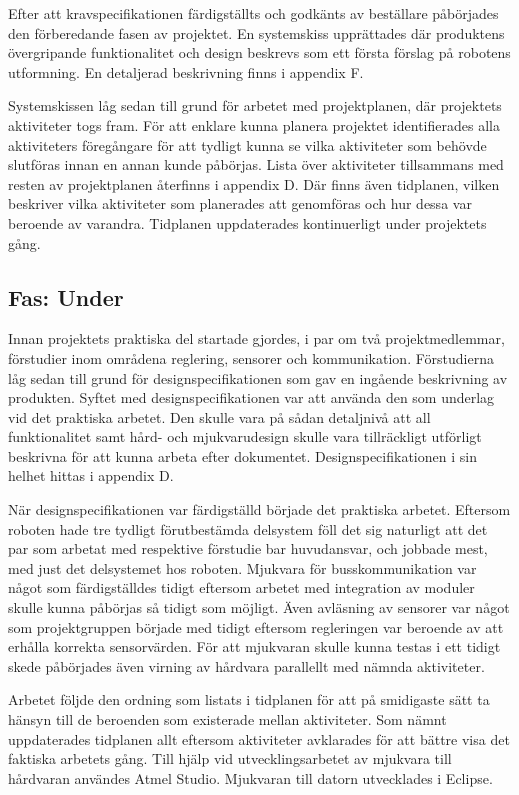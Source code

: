 \documentclass[11pt]{article}
\begin{document}
\begin{flushleft}
Efter att kravspecifikationen färdigställts och godkänts av beställare påbörjades den förberedande fasen av projektet. En systemskiss upprättades där produktens övergripande funktionalitet och design beskrevs som ett första förslag på robotens utformning. En detaljerad beskrivning finns i appendix F. 

Systemskissen låg sedan till grund för arbetet med projektplanen, där projektets aktiviteter togs fram. För att enklare kunna planera projektet identifierades alla aktiviteters föregångare för att tydligt kunna se vilka aktiviteter som behövde slutföras innan en annan kunde påbörjas. Lista över aktiviteter tillsammans med resten av projektplanen återfinns i appendix D. Där finns även tidplanen, vilken beskriver vilka aktiviteter som planerades att genomföras och hur dessa var beroende av varandra. Tidplanen uppdaterades kontinuerligt under projektets gång.

\subsection{Fas: Under}
Innan projektets praktiska del startade gjordes, i par om två projektmedlemmar, förstudier inom områdena reglering, sensorer och kommunikation. Förstudierna låg sedan till grund för designspecifikationen som gav en ingående beskrivning av produkten. Syftet med designspecifikationen var att använda den som underlag vid det praktiska arbetet. Den skulle vara på sådan detaljnivå att all funktionalitet samt hård- och mjukvarudesign skulle vara tillräckligt utförligt beskrivna för att kunna arbeta efter dokumentet. Designspecifikationen i sin helhet hittas i appendix D. 

När designspecifikationen var färdigställd började det praktiska arbetet. Eftersom roboten hade tre tydligt förutbestämda delsystem föll det sig naturligt att det par som arbetat med respektive förstudie bar huvudansvar, och jobbade mest, med just det delsystemet hos roboten. Mjukvara för busskommunikation var något som färdigställdes tidigt eftersom arbetet med integration av moduler skulle kunna påbörjas så tidigt som möjligt. Även avläsning av sensorer var något som projektgruppen började med tidigt eftersom regleringen var beroende av att erhålla korrekta sensorvärden. För att mjukvaran skulle kunna testas i ett tidigt skede påbörjades även virning av hårdvara parallellt med nämnda aktiviteter. 

Arbetet följde den ordning som listats i tidplanen för att på smidigaste sätt ta hänsyn till de beroenden som existerade mellan aktiviteter. Som nämnt uppdaterades tidplanen allt eftersom aktiviteter avklarades för att bättre visa det faktiska arbetets gång. Till hjälp vid utvecklingsarbetet av mjukvara till hårdvaran användes Atmel Studio. Mjukvaran till datorn utvecklades i Eclipse. 


\end{flushleft}
\end{document}
